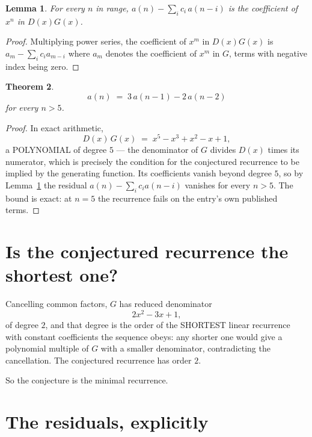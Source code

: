 \documentclass[11pt,a4paper]{article}
\theoremstyle{plain}
\newtheorem{theorem}{Theorem}
\newtheorem{lemma}[theorem]{Lemma}
\theoremstyle{definition}
\begin{document}
\begin{lemma}\label{lem:key}
For every $n$ in range, $a(n)-\sum_i c_i\,a(n-i)$ is the coefficient of $x^{n}$ in
$D(x)G(x)$.
\end{lemma}

\begin{proof}
Multiplying power series, the coefficient of $x^{m}$ in $D(x)G(x)$ is
$a_m-\sum_i c_i a_{m-i}$ where $a_m$ denotes the coefficient of $x^{m}$ in $G$, terms with
negative index being zero.
\end{proof}

\begin{theorem}
\[
a(n)\;=\;3\,a(n-1) - 2\,a(n-2)
\]
for every $n>5$.
\end{theorem}

\begin{proof}
In exact arithmetic,
\[
D(x)\,G(x)\;=\;x^{5} - x^{3} + x^{2} - x + 1,
\]
a POLYNOMIAL of degree $5$ --- the denominator of $G$ divides $D(x)$ times its numerator,
which is precisely the condition for the conjectured recurrence to be implied by the
generating function. Its coefficients vanish beyond degree $5$, so by
Lemma~\ref{lem:key} the residual $a(n)-\sum_ic_ia(n-i)$ vanishes for every
$n>5$. The bound is exact: at $n=5$ the recurrence fails on the entry's own published terms.
\end{proof}

\section{Is the conjectured recurrence the shortest one?}

Cancelling common factors, $G$ has reduced denominator
\[
2 x^{2} - 3 x + 1,
\]
of degree $2$, and that degree is the order of the SHORTEST linear recurrence with
constant coefficients the sequence obeys: any shorter one would give a polynomial multiple of
$G$ with a smaller denominator, contradicting the cancellation. The conjectured recurrence has
order $2$.

So the conjecture is the minimal recurrence.

\section{The residuals, explicitly}
\end{document}
